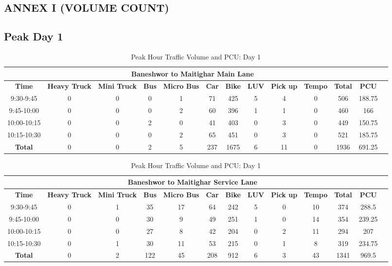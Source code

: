 \begin{landscape}
\chapter{ANNEX I (VOLUME COUNT)}
\section{Peak Day 1}
\centering
\begin{table}[h!]
\centering
\caption{Peak Hour Traffic Volume and PCU: Day 1}
\begin{tabular}{|c|c|c|c|c|c|c|c|c|c|c|c|c|}
    \hline
    \multicolumn{12}{|c|}{\textbf{Baneshwor to Maitighar Main Lane}} \\
    \hline
    \textbf{Time} & \textbf{Heavy Truck} & \textbf{Mini Truck} & \textbf{Bus} & \textbf{Micro Bus} & \textbf{Car} & \textbf{Bike} & \textbf{LUV} & \textbf{Pick up} & \textbf{Tempo} & \textbf{\textbf{Total}} & \textbf{PCU} \\
    \hline
    9:30-9:45	&0	&0	&0	&1	&71	&425	&5	&4	&0	&506	&188.75 \\ \hline
    9:45-10:00	&0	&0	&0	&2	&60	&396	&1	&1	&0	&460	&166 \\ \hline
    10:00-10:15	&0	&0	&2	&0	&41	&403	&0	&3	&0	&449	&150.75 \\ \hline
    10:15-10:30	&0	&0	&0	&2	&65	&451	&0	&3	&0	&521	&185.75 \\
    \hline
    \textbf{Total}	    &0	&0	&2	&5	&237	&1675	&6	&11	&0	&1936	&691.25 \\
    \hline
\end{tabular}

\vspace{0.5cm}

\begin{tabular}{|c|c|c|c|c|c|c|c|c|c|c|c|c|}
        \hline
        \multicolumn{12}{|c|}{\textbf{Baneshwor to Maitighar Service Lane}} \\
        \hline
        \textbf{Time} & \textbf{Heavy Truck} & \textbf{Mini Truck} & \textbf{Bus} & \textbf{Micro Bus} & \textbf{Car} & \textbf{Bike} & \textbf{LUV} & \textbf{Pick up} & \textbf{Tempo} & \textbf{\textbf{Total}} & \textbf{PCU} \\
        \hline
        9:30-9:45	&0	&1	&35	&17	&64	&242	&5	&0	&10	&374	&288.5 \\ \hline
        9:45-10:00	&0	&0	&30	&9	&49	&251	&1	&0	&14	&354	&239.25 \\ \hline
        10:00-10:15	&0	&0	&27	&8	&42	&204	&0	&2	&11	&294	&207 \\ \hline
        10:15-10:30	&0	&1	&30	&11	&53	&215	&0	&1	&8	&319	&234.75 \\ \hline
        \textbf{Total}	    &0	&2	&122	&45	&208	&912	&6	&3	&43	&1341	&969.5 \\ \hline
\end{tabular}

\vspace{0.5cm}


\end{table}
\end{landscape}

